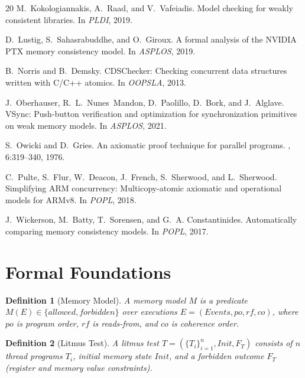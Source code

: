 \documentclass[11pt]{article}
\newtheorem{definition}{Definition}
\begin{document}
\begin{thebibliography}{20}
M.~Kokologiannakis, A.~Raad, and V.~Vafeiadis.
\newblock Model checking for weakly consistent libraries.
\newblock In {\em PLDI}, 2019.

D.~Lustig, S.~Sahasrabuddhe, and O.~Giroux.
\newblock A formal analysis of the NVIDIA PTX memory consistency model.
\newblock In {\em ASPLOS}, 2019.

B.~Norris and B.~Demsky.
\newblock CDSChecker: Checking concurrent data structures written with C/C++
  atomics.
\newblock In {\em OOPSLA}, 2013.

J.~Oberhauser, R.~L.~Nunes~Mandon, D.~Paolillo, D.~Bork, and
  J.~Alglave.
\newblock VSync: Push-button verification and optimization for
  synchronization primitives on weak memory models.
\newblock In {\em ASPLOS}, 2021.

S.~Owicki and D.~Gries.
\newblock An axiomatic proof technique for parallel programs.
, 6:319--340, 1976.

C.~Pulte, S.~Flur, W.~Deacon, J.~French, S.~Sherwood, and L.~Sherwood.
\newblock Simplifying ARM concurrency: Multicopy-atomic axiomatic and
  operational models for ARMv8.
\newblock In {\em POPL}, 2018.

J.~Wickerson, M.~Batty, T.~Sorensen, and G.~A. Constantinides.
\newblock Automatically comparing memory consistency models.
\newblock In {\em POPL}, 2017.

\end{thebibliography}

\appendix

\section{Formal Foundations}
\label{app:formal}

\begin{definition}[Memory Model]
A memory model $M$ is a predicate $M(E) \in \{\mathit{allowed},
\mathit{forbidden}\}$ over executions $E = (Events, po, rf, co)$,
where $po$ is program order, $rf$ is reads-from, and $co$ is
coherence order.
\end{definition}

\begin{definition}[Litmus Test]
A litmus test $T = (\{T_i\}_{i=1}^n, \mathit{Init}, F_T)$ consists
of $n$ thread programs $T_i$, initial memory state $\mathit{Init}$,
and a forbidden outcome $F_T$ (register and memory value constraints).
\end{definition}
\end{document}
